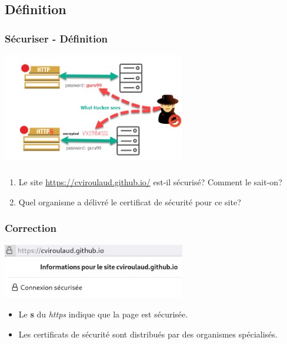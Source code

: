 \documentclass[svgnames,11pt]{beamer}
\begin{document}
\subsection{Définition}
\begin{frame}
    \frametitle{Sécuriser - Définition}

    \begin{center}
        \centering
        \includegraphics[width=8cm]{ressources/secure.png}
        \label{IMG}
    \end{center}
\end{frame}
\begin{frame}
    \frametitle{}

    \begin{activite}
        \begin{enumerate}
            \item Le site \url{https://cviroulaud.github.io/} est-il sécurisé? Comment le sait-on?
            \item Quel organisme a délivré le certificat de sécurité pour ce site?
        \end{enumerate}
    \end{activite}

\end{frame}
\begin{frame}
    \frametitle{Correction}

    \begin{center}
        \centering
        \includegraphics[width=8cm]{ressources/certificat.png}
    \end{center}
    \begin{aretenir}[]
        \begin{itemize}
            \item Le \textbf{s} du \emph{https} indique que la page est sécurisée.
            \item Les certificats de sécurité sont distribués par des organismes spécialisés.
        \end{itemize}
    \end{aretenir}
\end{frame}
\end{document}
